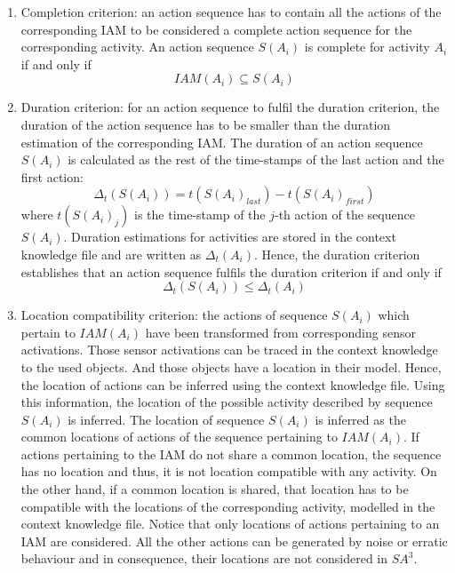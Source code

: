 \begin{enumerate}
  \item Completion criterion: an action sequence has to contain all the actions of the corresponding IAM to be considered a complete action sequence for the corresponding activity. An action sequence $S(A_i)$ is complete for activity $A_i$ if and only if 
  \begin{equation}
  \label{eq-completion}
  IAM(A_i) \subseteq S(A_i)   
  \end{equation}
  
  \item Duration criterion: for an action sequence to fulfil the duration criterion, the duration of the action sequence has to be smaller than the duration estimation of the corresponding IAM. The duration of an action sequence $S(A_i)$ is calculated as the rest of the time-stamps of the last action and the first action: 
  \begin{equation}
    \Delta_t(S(A_i)) = t(S(A_i)_{last}) - t(S(A_i)_{first})
  \end{equation}
  where $t(S(A_i)_j)$ is the time-stamp of the $j$-th action of the sequence $S(A_i)$. Duration estimations for activities are stored in the context knowledge file and are written as $\Delta_t(A_i)$. Hence, the duration criterion establishes that an action sequence fulfils the duration criterion if and only if 
  \begin{equation}
   \label{eq-duration}
   \Delta_t(S(A_i)) \leq \Delta_t(A_i)
  \end{equation}  
  
  \item Location compatibility criterion: the actions of sequence $S(A_i)$ which pertain to $IAM(A_i)$ have been transformed from corresponding sensor activations. Those sensor activations can be traced in the context knowledge to the used objects. And those objects have a location in their model. Hence, the location of actions can be inferred using the context knowledge file. Using this information, the location of the possible activity described by sequence $S(A_i)$ is inferred. The location of sequence $S(A_i)$ is inferred as the common locations of actions of the sequence pertaining to $IAM(A_i)$. If actions pertaining to the IAM do not share a common location, the sequence has no location and thus, it is not location compatible with any activity. On the other hand, if a common location is shared, that location has to be compatible with the locations of the corresponding activity, modelled in the context knowledge file. Notice that only locations of actions pertaining to an IAM are considered. All the other actions can be generated by noise or erratic behaviour and in consequence, their locations are not considered in $SA^3$.
 \end{enumerate}

